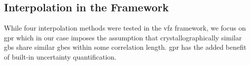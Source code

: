 \documentclass[final,twocolumn,12pt]{elsarticle}
\begin{document}
%	
	
	\subsection{Interpolation in the  Framework}
	\label{sec:methods:interp}
	
	While four interpolation methods were tested in the \gls{vfz} framework, we focus on \gls{gpr} which in our case imposes the assumption that crystallographically similar \glspl{gb} share similar \glspl{gbe} within some correlation length. \Gls{gpr} has the added benefit of built-in uncertainty quantification.
%	
%	
\end{document}
